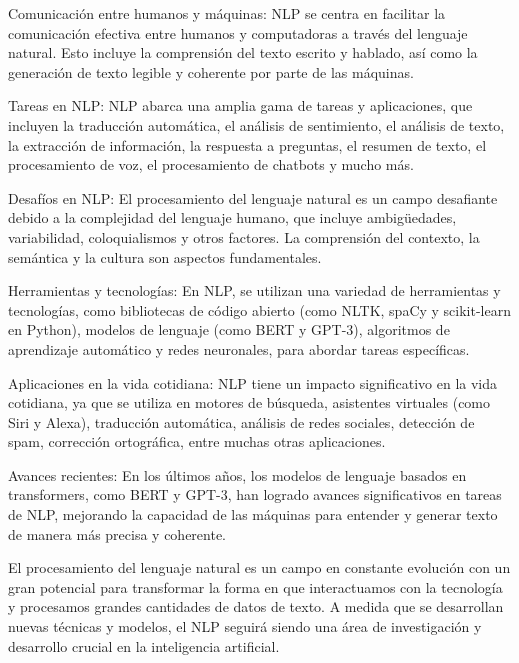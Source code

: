 Comunicación entre humanos y máquinas: NLP se centra en facilitar la comunicación efectiva entre humanos y computadoras a través del lenguaje natural. Esto incluye la comprensión del texto escrito y hablado, así como la generación de texto legible y coherente por parte de las máquinas.

Tareas en NLP: NLP abarca una amplia gama de tareas y aplicaciones, que incluyen la traducción automática, el análisis de sentimiento, el análisis de texto, la extracción de información, la respuesta a preguntas, el resumen de texto, el procesamiento de voz, el procesamiento de chatbots y mucho más.

Desafíos en NLP: El procesamiento del lenguaje natural es un campo desafiante debido a la complejidad del lenguaje humano, que incluye ambigüedades, variabilidad, coloquialismos y otros factores. La comprensión del contexto, la semántica y la cultura son aspectos fundamentales.

Herramientas y tecnologías: En NLP, se utilizan una variedad de herramientas y tecnologías, como bibliotecas de código abierto (como NLTK, spaCy y scikit-learn en Python), modelos de lenguaje (como BERT y GPT-3), algoritmos de aprendizaje automático y redes neuronales, para abordar tareas específicas.

Aplicaciones en la vida cotidiana: NLP tiene un impacto significativo en la vida cotidiana, ya que se utiliza en motores de búsqueda, asistentes virtuales (como Siri y Alexa), traducción automática, análisis de redes sociales, detección de spam, corrección ortográfica, entre muchas otras aplicaciones.

Avances recientes: En los últimos años, los modelos de lenguaje basados en transformers, como BERT y GPT-3, han logrado avances significativos en tareas de NLP, mejorando la capacidad de las máquinas para entender y generar texto de manera más precisa y coherente.

El procesamiento del lenguaje natural es un campo en constante evolución con un gran potencial para transformar la forma en que interactuamos con la tecnología y procesamos grandes cantidades de datos de texto. A medida que se desarrollan nuevas técnicas y modelos, el NLP seguirá siendo una área de investigación y desarrollo crucial en la inteligencia artificial.



